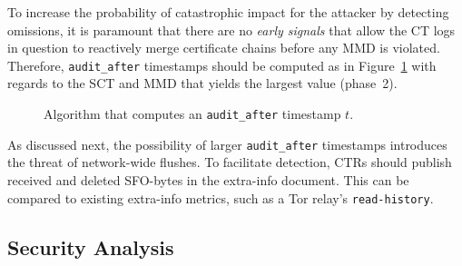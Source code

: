 To increase the probability of catastrophic impact for the attacker by detecting
omissions, it is paramount that there are no \emph{early signals} that
allow the CT logs in question to reactively merge certificate chains before
any MMD is violated.  Therefore, \texttt{audit\_after} timestamps should be
computed as in Figure~\ref{fig:audit-after} with regards to the SCT and MMD that
yields the largest value (phase~2).

\begin{figure}
	\centering
	\caption{%
		Algorithm that computes an \texttt{audit\_after} timestamp $t$.
	}
	\label{fig:audit-after}
\end{figure}

%
%

As discussed next, the possibility of larger \texttt{audit\_after} timestamps
introduces the threat of network-wide flushes.  To facilitate detection, CTRs
should publish received and deleted SFO-bytes in the extra-info document.  This
can be compared to existing extra-info metrics, such as a Tor relay's
\texttt{read-history}.

\subsection{Security Analysis}
